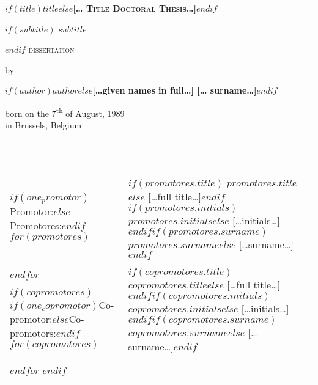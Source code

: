 \documentclass[$if(fontsize)$$fontsize$,$endif$$if(papersize)$$papersize$paper,twoside,$endif$$for(classoption)$$classoption$$sep$,$endfor$]{$documentclass$} %
\begin{document}
\clearpage
\thispagestyle{empty}
\vspace*{\drop}
\begin{center}
\huge\textbf{\textsc{$if(title)$$title$$else$[… Title Doctoral Thesis…]$endif$}}\par
$if(subtitle)$
\Large\textsc{$subtitle$}\par
$endif$
\vfill %
\large \textsc{dissertation}\par
\vspace{\baselineskip}
\par %
\vspace{\baselineskip}
{\normalsize by}\par
{\normalsize\textbf{$if(author)$$author$$else$[…given names in full…] [… surname…]$endif$}}\par
\normalsize born on the 7\textsuperscript{th} of August, 1989\\
in Brussels, Belgium
\end{center}

\clearpage
\thispagestyle{empty}
\noindent{}\\
\\
\noindent\begin{tabular}{@{}lll}

$if(one_promotor)$Promotor:$else$Promotores:$endif$
$for(promotores)$
& $if(promotores.title)$ $promotores.title$$else$ […full title…]$endif$$if(promotores.initials)$ $promotores.initials$$else$ […initials…]$endif$$if(promotores.surname)$ $promotores.surname$$else$ […surname…]$endif$\\
$endfor$

$if(copromotores)$
$if(one_copromotor)$Co-promotor:$else$Co-promotors:$endif$
$for(copromotores)$
& $if(copromotores.title)$ $copromotores.title$$else$ […full title…]$endif$$if(copromotores.initials)$ $copromotores.initials$$else$ […initials…]$endif$$if(copromotores.surname)$ $copromotores.surname$$else$ […surname…]$endif$\\
$endfor$
$endif$
\end{tabular}\\
\end{document}
